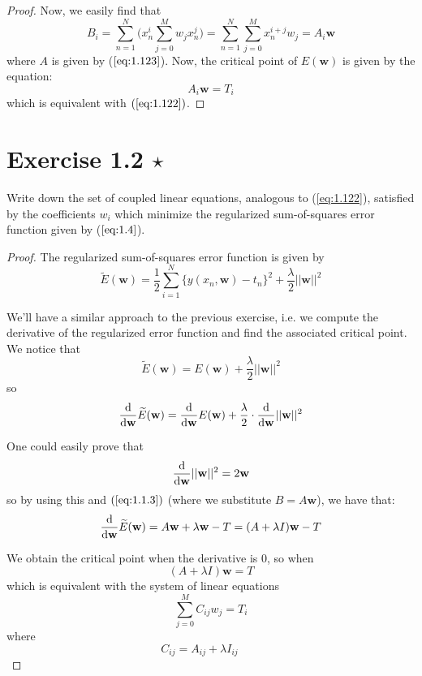 \begin{proof}
    Now, we easily find that
    \[
        B_i = \sum_{n = 1}^{N} \bigg(x_n^i \sum_{j = 0}^M w_j x_n^j\bigg)
        = \sum_{n = 1}^{N} \sum_{j = 0}^M x_n^{i + j} w_j
        = A_i \mathbf{w}
    \] 
    where $A$ is given by ($\ref{eq:1.123}$). Now, the critical point of $E(\mathbf{w})$ 
    is given by the equation:
    \[
        A_i \mathbf{w} = T_i
    \] 
    which is equivalent with $(\ref{eq:1.122})$.
\end{proof}

\section*{Exercise 1.2 $\star$}
Write down the set of coupled linear equations, analogous to (\ref{eq:1.122}), satisfied
by the coefficients $w_i$ which minimize the regularized sum-of-squares error
function given by ($\ref{eq:1.4}$).
    
\vspace{1em}

\begin{proof}
    The regularized sum-of-squares error function is given by
    \begin{equation}\label{eq:1.4}\tag{1.4}
        \widetilde{E}(\mathbf{w}) = \frac{1}{2} \sum_{i = 1}^N 
            \{y(x_n, \mathbf{w}) - t_n\}^2 + \frac{\lambda}{2} ||\mathbf{w}||^2
    \end{equation}

    We'll have a similar approach to the previous exercise, i.e. we compute
    the derivative of the regularized error function and find the associated
    critical point. We notice that
    \[
        \widetilde{E}(\mathbf{w}) = E(\mathbf{w}) + \frac{\lambda}{2} ||\mathbf{w}||^2
    \] 
    so
    \[
        \dv{\mathbf{w}} \widetilde{E}(\mathbf{w}) 
        = \dv{\mathbf{w}} E(\mathbf{w}) + \frac{\lambda}{2} \cdot \dv{\mathbf{w}} ||\mathbf{w}||^2
    \] 

    One could easily prove that
    \[
        \dv{\mathbf{w}} ||\mathbf{w}||^2 = 2\mathbf{w}
    \] 
    so by using this and $(\ref{eq:1.1.3})$ (where we substitute $B = A\mathbf{w}$), we
    have that:
    \[
        \dv{\mathbf{w}} \widetilde{E}(\mathbf{w}) 
        = A\mathbf{w} + \lambda \mathbf{w} - T
        = (A + \lambda I)\mathbf{w} - T
    \] 

    We obtain the critical point when the derivative is 0, so when
    \[
        (A + \lambda I) \mathbf{w} = T
    \] 
    which is equivalent with the system of linear equations
    \[
        \sum_{j=0}^{M} C_{ij} w_j = T_i
    \] 
    where 
    \[
        C_{ij} = A_{ij} + \lambda I_{ij} \hspace{2em}
    \] 
\end{proof}

